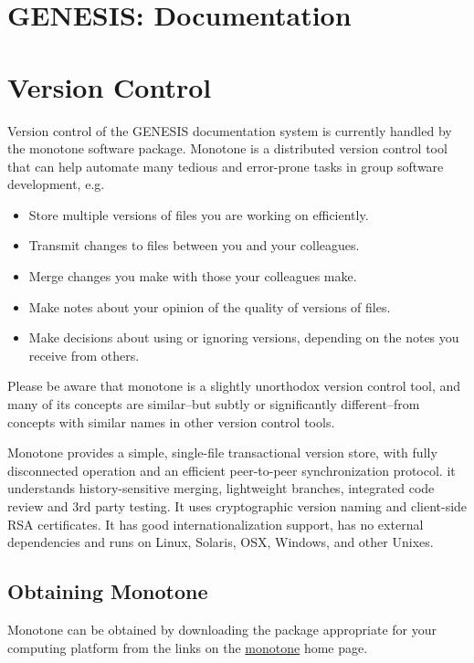 \documentclass[12pt]{article}
\begin{document}
\section*{GENESIS: Documentation}

\section*{Version Control}

Version control of the GENESIS documentation system is currently handled by the monotone software package. Monotone is a distributed version control tool that can help automate many tedious and error-prone tasks in group software development, e.g.
\begin{itemize}
\item Store multiple versions of files you are working on efficiently.
\item Transmit changes to files between you and your colleagues.
\item Merge changes you make with those your colleagues make.
\item Make notes about your opinion of the quality of versions of files.
\item Make decisions about using or ignoring versions, depending on the notes you receive from others. 
\end{itemize}
Please be aware that monotone is a slightly unorthodox version control tool, and many of its concepts are similar--but subtly or significantly different--from concepts with similar names in other version control tools. 

Monotone provides a simple, single-file transactional version store, with fully disconnected operation and an efficient peer-to-peer synchronization protocol. it understands history-sensitive merging, lightweight branches, integrated code review and 3rd party testing. It uses cryptographic version naming and client-side RSA certificates. It has good internationalization support, has no external dependencies and runs on Linux, Solaris, OSX, Windows, and other Unixes.

\subsection*{Obtaining Monotone}
Monotone can be obtained by downloading the package appropriate for your computing platform from the links on the \href{http://monotone.ca/}{monotone} home page.

\end{document}
